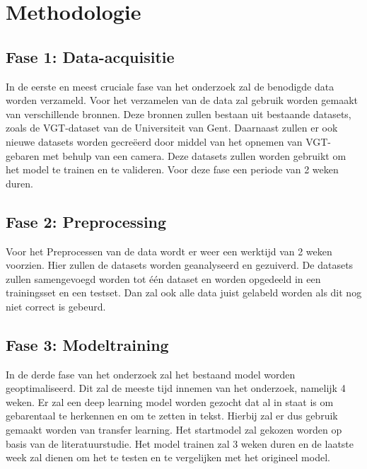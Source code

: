
\section{Methodologie}%
\label{sec:methodologie}
\subsection{Fase 1: Data-acquisitie}
In de eerste en meest cruciale fase van het onderzoek zal de benodigde data worden verzameld.
Voor het verzamelen van de data zal gebruik worden gemaakt van verschillende bronnen.
Deze bronnen zullen bestaan uit bestaande datasets, zoals de VGT-dataset van de Universiteit van Gent.
Daarnaast zullen er ook nieuwe datasets worden gecreëerd door middel van het opnemen van VGT-gebaren met behulp van een camera.
Deze datasets zullen worden gebruikt om het model te trainen en te valideren.
Voor deze fase een periode van 2 weken duren.
\subsection{Fase 2: Preprocessing}
Voor het Preprocessen van de data wordt er weer een werktijd van 2 weken voorzien.
Hier zullen de datasets worden geanalyseerd en gezuiverd.
De datasets zullen samengevoegd worden tot één dataset en worden opgedeeld in een trainingsset en een testset.
Dan zal ook alle data juist gelabeld worden als dit nog niet correct is gebeurd.
\subsection{Fase 3: Modeltraining}
In de derde fase van het onderzoek zal het bestaand model worden geoptimaliseerd.
Dit zal de meeste tijd innemen van het onderzoek, namelijk 4 weken.
Er zal een deep learning model worden gezocht dat al in staat is om gebarentaal te herkennen en om te zetten in tekst.
Hierbij zal er dus gebruik gemaakt worden van transfer learning.
Het startmodel zal gekozen worden op basis van de literatuurstudie.
Het model trainen zal 3 weken duren en de laatste week zal dienen om het te testen en te vergelijken met het origineel model.
